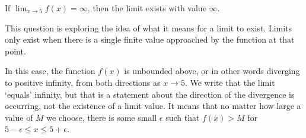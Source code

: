 \documentclass{ximera}
\author{Emma Smith Zbarsky}
\begin{document}
\begin{exercise}

If $\displaystyle \lim_{x\to 5} f(x) = \infty$, then the limit exists
with value $\infty$.


\begin{hint}
This question is exploring the idea of what it means for a limit to
exist. Limits only exist when there is a single finite value approached
by the function at that point.
\end{hint}


\begin{hint}
In this case, the function $f(x)$ is unbounded above, or in other words
diverging to positive infinity, from both directions as $x \to 5$. We
write that the limit `equals' infinity, but that is a statement about
the direction of the divergence is occurring, not the existence of a
limit value. It means that no matter how large a value of $M$ we choose,
there is some small $\epsilon$ such that $f(x)>M$ for
$5-\epsilon \leq x \leq 5+\epsilon$.
\end{hint}


\begin{multipleChoice}
\end{multipleChoice}

\end{exercise}
\end{document}
